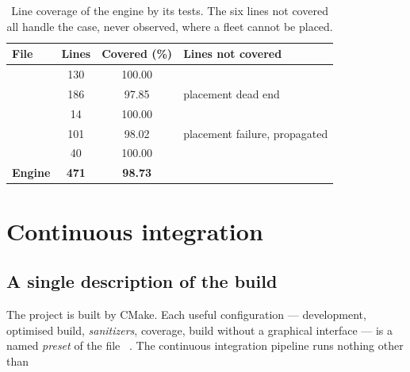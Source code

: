 \begin{table}[ht]
    \centering
    \begin{tabular}{@{}l S[table-format=3.0] S[table-format=3.2] l@{}}
        \toprule
        \textbf{File}      & {\textbf{Lines}} & {\textbf{Covered (\si{\percent})}} &
        \textbf{Lines not covered}                                                                                 \\
        \midrule
             & 130              & 100.00                             &                               \\
          & 186              & 97.85                              & placement dead end            \\
         & 14               & 100.00                             &                               \\
           & 101              & 98.02                              & placement failure, propagated \\
            & 40               & 100.00                             &                               \\
        \midrule
        \textbf{Engine}    & {\bfseries 471}  & {\bfseries 98.73}                  &                               \\
        \bottomrule
    \end{tabular}
    \caption{Line coverage of the engine by its tests. The six lines not covered all handle
        the case, never observed, where a fleet cannot be placed.}
    \label{tab-couverture}
\end{table}

\section{Continuous integration}
\label{sec-ci}

\subsection{A single description of the build}

The project is built by CMake. Each useful configuration --- development, optimised build,
\emph{sanitizers}, coverage, build without a graphical interface --- is a named \emph{preset}
of the file ~\cite{cmakepresets}. The continuous integration
pipeline runs nothing other than

